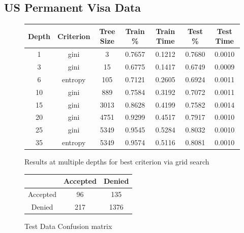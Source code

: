 \documentclass[h]{article}
\begin{document}
\subsection*{US Permanent Visa Data}
\begin{figure}[H]
\begin{tabular}{ | c | c  | c | c | c | c | c |} 
\hline
\textbf{Depth} & \textbf{Criterion} & \textbf{Tree Size} & \textbf{Train \%} & \textbf{Train Time} & \textbf{Test \%} & \textbf{Test Time}   \\
\hline
1 & gini & 3 & 0.7657 & 0.1212 & 0.7680 & 0.0010 \\ \hline
3 & gini & 15 & 0.6775 & 0.1417 & 0.6749 & 0.0009 \\ \hline
6 & entropy & 105 & 0.7121 & 0.2605 & 0.6924 & 0.0011 \\ \hline
10 & gini & 889 & 0.7584 & 0.3192 & 0.7072 & 0.0011 \\ \hline
15 & gini & 3013 & 0.8628 & 0.4199 & 0.7582 & 0.0014 \\ \hline
20 & gini & 4751 & 0.9299 & 0.4517 & 0.7917 & 0.0010 \\ \hline
25 & gini & 5349 & 0.9545 & 0.5284 & 0.8032 & 0.0010 \\ \hline
35 & entropy & 5349 & 0.9574 & 0.5116 & 0.8081 & 0.0010 \\ \hline
\end{tabular}
\caption*{Results at multiple depths for best criterion via grid search}
\endminipage\hfill
{}
\begin{flushright}
\begin{tabular}{ | c | c | c  | } 
\hline
 & Accepted & Denied  \\
\hline
Accepted & 96 & 135 \\ \hline
Denied & 217 & 1376 \\ \hline
\end{tabular}
\caption*{Test Data Confusion matrix}
\end{flushright}
\endminipage\hfill

\end{figure}
\end{document}
